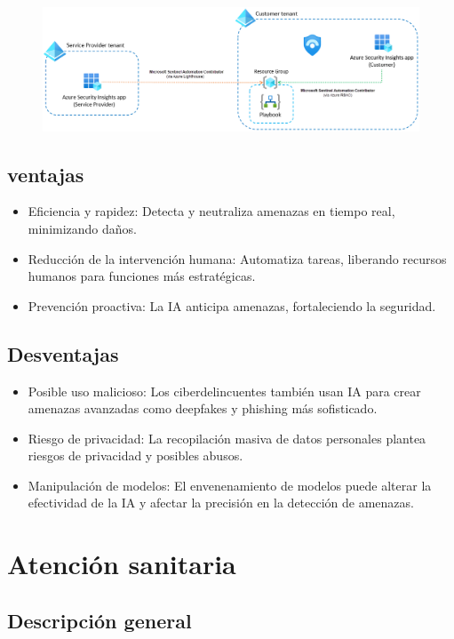 \documentclass[12pt]{article}
\begin{document}
\begin{figure}[h!]
    \centering
    \includegraphics[width=.6\textwidth]{ciberseguridad.png}
    \label{fig:my_label}
\end{figure}

\subsection{ventajas}

\begin{itemize}
    \item Eficiencia y rapidez: 
    Detecta y neutraliza amenazas en tiempo real, minimizando daños.
    \item Reducción de la intervención humana: 
    Automatiza tareas, liberando recursos humanos para funciones más estratégicas.
    \item Prevención proactiva: 
    La IA anticipa amenazas, fortaleciendo la seguridad.
\end{itemize}

\subsection{Desventajas}

\begin{itemize}
    \item Posible uso malicioso: 
    Los ciberdelincuentes también usan IA para crear amenazas avanzadas como deepfakes y phishing más sofisticado.
    \item Riesgo de privacidad: 
    La recopilación masiva de datos personales plantea riesgos de privacidad y posibles abusos.
    \item Manipulación de modelos: 
    El envenenamiento de modelos puede alterar la efectividad de la IA y afectar la precisión en la detección de amenazas.
\end{itemize}

\section{Atención sanitaria}

\subsection{Descripción general}
\end{document}

